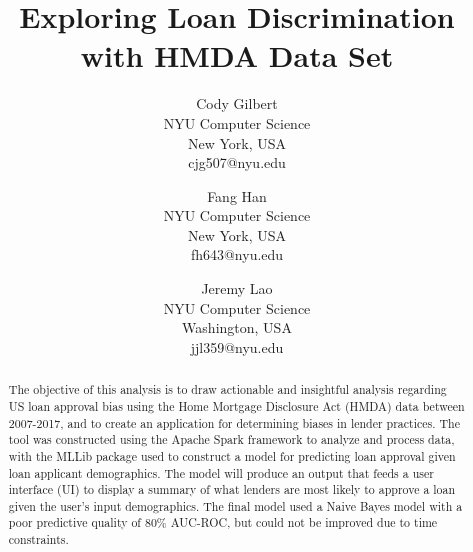 \documentclass[conference,compsoc]{IEEEtran}
\begin{document}
%
\title{Exploring Loan Discrimination with HMDA Data Set}


\author{
      Cody Gilbert \\
        NYU Computer Science \\
        New York, USA \\
        cjg507@nyu.edu \\
            \and
        Fang Han\\
        NYU Computer Science \\
        New York, USA \\
        fh643@nyu.edu\\
             \and
        Jeremy Lao \\
        NYU Computer Science  \\
        Washington, USA \\
        jjl359@nyu.edu



}




\maketitle

\begin{abstract}
The objective of this analysis is to draw actionable and insightful analysis regarding US loan approval bias using the Home Mortgage Disclosure Act (HMDA) data between 2007-2017, and to create an application for determining biases in lender practices. The tool was constructed using the Apache Spark framework to analyze and process data, with the MLLib package used to construct a model for predicting loan approval given loan applicant demographics. The model will produce an output that feeds a user interface (UI) to display a summary of what lenders are most likely to approve a loan given the user's input demographics. The final model used a Naive Bayes model with a poor predictive quality of 80\% AUC-ROC, but could not be improved due to time constraints.  


\end{abstract}
\end{document}
